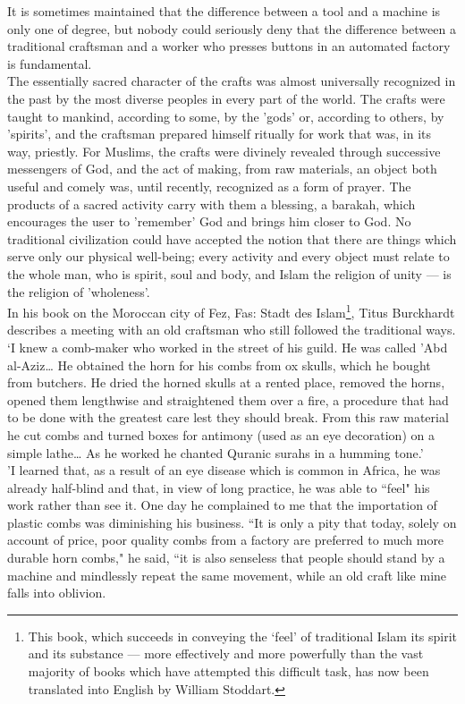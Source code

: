 \documentclass[10pt, twoside,openright]{book}
\begin{document}
It is sometimes maintained that the difference between a tool and a machine is only one of degree, 
but nobody could seriously deny that the difference between a traditional craftsman and a worker who 
presses buttons in an automated factory is fundamental. \\

The essentially sacred character of the crafts was almost universally recognized in the past by the 
most diverse peoples in every part of the world. The crafts were taught to mankind, according to 
some, by the 'gods' or, according to others, by 'spirits', and the craftsman prepared himself 
ritually for work that was, in its way, priestly. For Muslims, the crafts were divinely revealed 
through successive messengers of God, and the act of making, from raw materials, an object both 
useful and comely was, until recently, recognized as a form of prayer. The products of a sacred 
activity carry with them a blessing, a barakah, which encourages the user to 'remember' God and 
brings him closer to God. No traditional civilization could have accepted the notion that there are 
things which serve only our physical well\hyp{}being; every activity and every object must relate to the 
whole man, who is spirit, soul and body, and Islam the religion of unity --- is the religion of 
'wholeness'. \\

In his book on the Moroccan city of Fez, Fas: Stadt des Islam\footnote{This book, which succeeds in conveying the `feel' of traditional Islam its spirit and its substance --- more effectively and more powerfully than the vast majority of books which have attempted this 
difficult task, has now been translated into English by William Stoddart.}, Titus Burckhardt describes a 
meeting with an old craftsman who still followed the traditional ways. `I knew a comb\hyp{}maker who 
worked in the street of his guild. He was called 'Abd al\hyp{}Aziz\ldots{} He obtained the horn for his combs 
from ox skulls, which he bought from butchers. He dried the horned skulls at a rented place, removed 
the horns, opened them lengthwise and straightened them over a fire, a procedure that had to be done 
with the greatest care lest they should break. From this raw material he cut combs and turned boxes 
for antimony (used as an eye decoration) on a simple lathe\ldots{} As he worked he chanted Quranic surahs in a humming tone.' \\

'I learned that, as a result of an eye disease which is common in Africa, he was already half\hyp{}blind 
and that, in view of long practice, he was able to ``feel" his work rather than see it. One day he 
complained to me that the importation of plastic combs was diminishing his business. ``It is only a 
pity that today, solely on account of price, poor quality combs from a factory are preferred to much 
more durable horn combs," he said, ``it is also senseless that people should stand by a machine and 
mindlessly repeat the same movement, while an old craft like mine falls into oblivion. \\
\end{document}
